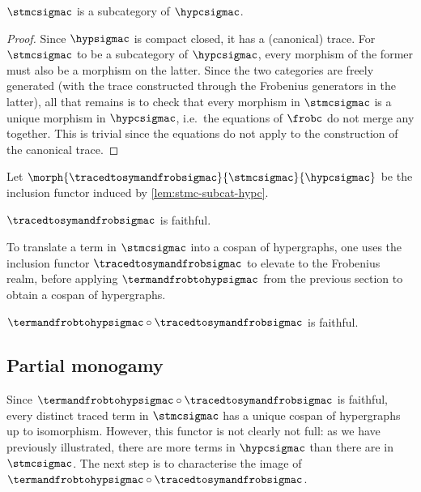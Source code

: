 \begin{lemma}
    \label{lem:stmc-subcat-hypc}
    \(\stmcsigmac\) is a subcategory of \(\hypcsigmac\).
\end{lemma}
\begin{proof}
    Since \(\hypsigmac\) is compact closed, it has a (canonical) trace.
    For \(\stmcsigmac\) to be a subcategory of \(\hypcsigmac\), every morphism
    of the former must also be a morphism on the latter.
    Since the two categories are freely generated (with the trace constructed
    through the Frobenius generators in the latter), all that remains is to
    check that every morphism in \(\stmcsigmac\) is a unique morphism in
    \(\hypcsigmac\), i.e.\ the equations of \(\frobc\) do not merge any together.
    This is trivial since the equations do not apply to the construction of the
    canonical trace.
\end{proof}

\begin{definition}
    Let \(\morph{\tracedtosymandfrobsigmac}{\stmcsigmac}{\hypcsigmac}\) be the
    inclusion functor induced by \cref{lem:stmc-subcat-hypc}.
\end{definition}

\begin{corollary}
    \(\tracedtosymandfrobsigmac\) is faithful.
\end{corollary}

To translate a term in \(\stmcsigmac\) into a cospan of hypergraphs, one uses
the inclusion functor \(\tracedtosymandfrobsigmac\) to elevate to the
Frobenius realm, before applying \(\termandfrobtohypsigmac\) from the previous
section to obtain a cospan of hypergraphs.

\begin{corollary}
    \(\termandfrobtohypsigmac \circ \tracedtosymandfrobsigmac\) is faithful.
\end{corollary}

\subsection{Partial monogamy}

Since \(\termandfrobtohypsigmac \circ \tracedtosymandfrobsigmac\) is faithful,
every distinct traced term in \(\stmcsigmac\) has a unique cospan of
hypergraphs up to isomorphism.
However, this functor is not clearly not full: as we have previously
illustrated, there are more terms in \(\hypcsigmac\) than there are in
\(\stmcsigmac\).
The next step is to characterise the image of
\(\termandfrobtohypsigmac \circ \tracedtosymandfrobsigmac\).

